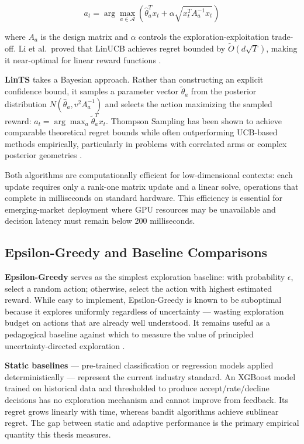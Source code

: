 \[a_t = \arg\max_{a \in \mathcal{A}} \left( \hat{\theta}_a^T x_t + \alpha \sqrt{x_t^T A_a^{-1} x_t} \right)\]

where \(A_a\) is the design matrix and \(\alpha\) controls the exploration-exploitation trade-off. Li et al.~proved that LinUCB achieves regret bounded by \(\tilde{O}(d \sqrt{T})\), making it near-optimal for linear reward functions \citep{Li2010}.

\textbf{LinTS} \citep{Agrawal2013} takes a Bayesian approach. Rather than constructing an explicit confidence bound, it samples a parameter vector \(\tilde{\theta}_a\) from the posterior distribution \(N(\hat{\theta}_a, v^2 A_a^{-1})\) and selects the action maximizing the sampled reward: \(a_t = \arg\max_a \tilde{\theta}_a^T x_t\). Thompson Sampling has been shown to achieve comparable theoretical regret bounds while often outperforming UCB-based methods empirically, particularly in problems with correlated arms or complex posterior geometries \citep{Agrawal2013, Russo2018}.

Both algorithms are computationally efficient for low-dimensional contexts: each update requires only a rank-one matrix update and a linear solve, operations that complete in milliseconds on standard hardware. This efficiency is essential for emerging-market deployment where GPU resources may be unavailable and decision latency must remain below 200 milliseconds.

\subsection{Epsilon-Greedy and Baseline Comparisons}\label{epsilon-greedy-and-baseline-comparisons}

\textbf{Epsilon-Greedy} serves as the simplest exploration baseline: with probability \(\epsilon\), select a random action; otherwise, select the action with highest estimated reward. While easy to implement, Epsilon-Greedy is known to be suboptimal because it explores uniformly regardless of uncertainty --- wasting exploration budget on actions that are already well understood. It remains useful as a pedagogical baseline against which to measure the value of principled uncertainty-directed exploration \citep{Sutton2018}.

\textbf{Static baselines} --- pre-trained classification or regression models applied deterministically --- represent the current industry standard. An XGBoost model trained on historical data and thresholded to produce accept/rate/decline decisions has no exploration mechanism and cannot improve from feedback. Its regret grows linearly with time, whereas bandit algorithms achieve sublinear regret. The gap between static and adaptive performance is the primary empirical quantity this thesis measures.

